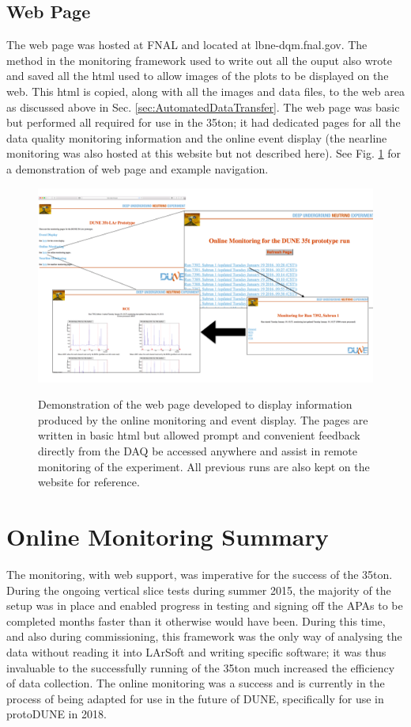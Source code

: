 \subsection{Web Page}\label{sec:WebPage}

The web page was hosted at FNAL and located at lbne-dqm.fnal.gov.  The method in the monitoring framework used to write out all the ouput also wrote and saved all the html used to allow images of the plots to be displayed on the web.  This html is copied, along with all the images and data files, to the web area as discussed above in Sec. \ref{sec:AutomatedDataTransfer}.  The web page was basic but performed all required for use in the 35ton; it had dedicated pages for all the data quality monitoring information and the online event display (the nearline monitoring was also hosted at this website but not described here).  See Fig. \ref{fig:WebPage} for a demonstration of web page and example navigation.

\begin{figure}[ht]
  \centering
  \includegraphics[width=14cm]{webPage.png}
  \label{fig:WebPage}
  \caption[Web page for online monitoring and event displays]{Demonstration of the web page developed to display information produced by the online monitoring and event display.  The pages are written in basic html but allowed prompt and convenient feedback directly from the DAQ be accessed anywhere and assist in remote monitoring of the experiment.  All previous runs are also kept on the website for reference.}
\end{figure}

\section{Online Monitoring Summary}

The monitoring, with web support, was imperative for the success of the 35ton.  During the ongoing vertical slice tests during summer 2015, the majority of the setup was in place and enabled progress in testing and signing off the APAs to be completed months faster than it otherwise would have been.  During this time, and also during commissioning, this framework was the only way of analysing the data without reading it into LArSoft and writing specific software; it was thus invaluable to the successfully running of the 35ton much increased the efficiency of data collection.  The online monitoring was a success and is currently in the process of being adapted for use in the future of DUNE, specifically for use in protoDUNE in 2018.
